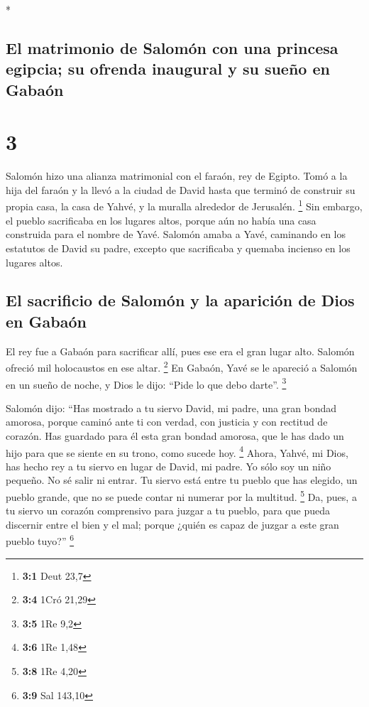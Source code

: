 \begin{paracol}{2}
\begin{otherlanguage}{english}
\end{otherlanguage}

\switchcolumn[0]*

\hypertarget{el-matrimonio-de-salomuxf3n-con-una-princesa-egipcia-su-ofrenda-inaugural-y-su-sueuxf1o-en-gabauxf3n}{%
\subsection{El matrimonio de Salomón con una princesa egipcia; su
ofrenda inaugural y su sueño en
Gabaón}\label{el-matrimonio-de-salomuxf3n-con-una-princesa-egipcia-su-ofrenda-inaugural-y-su-sueuxf1o-en-gabauxf3n}}

\hypertarget{section-4}{%
\section{3}\label{section-4}}

 Salomón hizo una alianza matrimonial con el faraón, rey
de Egipto. Tomó a la hija del faraón y la llevó a la ciudad de David
hasta que terminó de construir su propia casa, la casa de Yahvé, y la
muralla alrededor de Jerusalén. \footnote{\textbf{3:1} Deut 23,7}
 Sin embargo, el pueblo sacrificaba en los lugares altos,
porque aún no había una casa construida para el nombre de Yavé.
 Salomón amaba a Yavé, caminando en los estatutos de David
su padre, excepto que sacrificaba y quemaba incienso en los lugares
altos.

\hypertarget{el-sacrificio-de-salomuxf3n-y-la-apariciuxf3n-de-dios-en-gabauxf3n}{%
\subsection{El sacrificio de Salomón y la aparición de Dios en
Gabaón}\label{el-sacrificio-de-salomuxf3n-y-la-apariciuxf3n-de-dios-en-gabauxf3n}}

 El rey fue a Gabaón para sacrificar allí, pues ese era el
gran lugar alto. Salomón ofreció mil holocaustos en ese altar.
\footnote{\textbf{3:4} 1Cró 21,29}  En Gabaón, Yavé se le
apareció a Salomón en un sueño de noche, y Dios le dijo: ``Pide lo que
debo darte''. \footnote{\textbf{3:5} 1Re 9,2}

 Salomón dijo: ``Has mostrado a tu siervo David, mi padre,
una gran bondad amorosa, porque caminó ante ti con verdad, con justicia
y con rectitud de corazón. Has guardado para él esta gran bondad
amorosa, que le has dado un hijo para que se siente en su trono, como
sucede hoy. \footnote{\textbf{3:6} 1Re 1,48}  Ahora,
Yahvé, mi Dios, has hecho rey a tu siervo en lugar de David, mi padre.
Yo sólo soy un niño pequeño. No sé salir ni entrar.  Tu
siervo está entre tu pueblo que has elegido, un pueblo grande, que no se
puede contar ni numerar por la multitud. \footnote{\textbf{3:8} 1Re 4,20}
 Da, pues, a tu siervo un corazón comprensivo para juzgar
a tu pueblo, para que pueda discernir entre el bien y el mal; porque
¿quién es capaz de juzgar a este gran pueblo tuyo?'' \footnote{\textbf{3:9}
  Sal 143,10}


\end{paracol}
